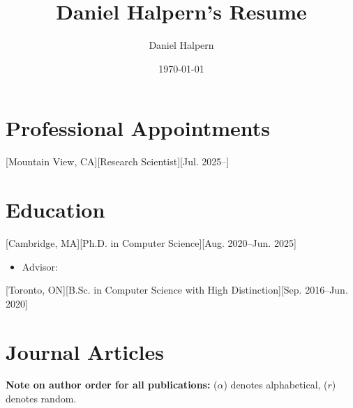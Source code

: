 \documentclass{article}
\title{Daniel Halpern's Resume}
\author{Daniel Halpern}
\date{\today}
\newcommand{\link}[2]{\iftoggle{uselinks}{\href{#1}{#2}}{#2}\xspace}
\begin{document}

    \makecvtitle %

    \section{Professional Appointments}

    [Mountain View, CA][Research Scientist][Jul. 2025--]


    \section{Education}

    [Cambridge, MA][Ph.D. in Computer Science][Aug. 2020--Jun. 2025]
\begin{itemize}
    \item Advisor: \link{http://procaccia.info}{Ariel D. Procaccia}
\end{itemize}

    [Toronto, ON][B.Sc. in Computer Science with High Distinction][Sep. 2016--Jun. 2020]

    
    
	\section{Journal Articles}
    
    \renewcommand{\labelenumi}{J\theenumi.}
    {\footnotesize \textbf{Note on author order for all publications:} ($\alpha$) denotes alphabetical, ($r$) denotes random.}
    \begin{etaremune}
    [itemsep=0.2ex,
        leftmargin=4.8ex]
        
    \end{etaremune}
\end{document}

